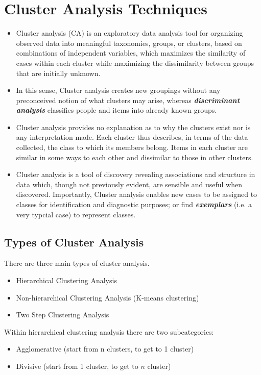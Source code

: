 \section{Cluster Analysis Techniques}
\begin{itemize}
\item Cluster analysis (CA) is an exploratory data analysis tool for organizing observed data into meaningful taxonomies, groups, or
clusters, based on combinations of independent variables, which maximizes the similarity of cases within
each cluster while maximizing the dissimilarity between groups that are initially unknown.

\item In this sense, Cluster analysis creates new groupings without any preconceived notion of what clusters
may arise, whereas \textit{\textbf{discriminant analysis}} classifies people and items into
already known groups.

\item Cluster analysis provides no explanation as to why the clusters exist nor is any
interpretation made. Each cluster thus describes, in terms of the data collected, the class to
which its members belong. Items in each cluster are similar in some ways to each other and
dissimilar to those in other clusters.

\item Cluster analysis is a tool of discovery revealing associations and structure in data which, though not previously
evident, are sensible and useful when discovered. Importantly, Cluster analysis enables new
cases to be assigned to classes for identification and diagnostic purposes; or find \textbf{\textit{exemplars}} (i.e. a very typcial case)
to represent classes.
\end{itemize}

\subsection{Types of Cluster Analysis}
There are three main types of cluster analysis.
\begin{itemize}
\item Hierarchical Clustering Analysis
\item Non-hierarchical Clustering Analysis (K-means clustering)
\item Two Step Clustering Analysis
\end{itemize}

\noindent Within hierarchical clustering analysis there are two subcategories: 
\begin{itemize}
\item Agglomerative (start from n clusters, to get to 1 cluster)
\item Divisive (start from 1 cluster, to get to $n$ cluster)
\end{itemize}


